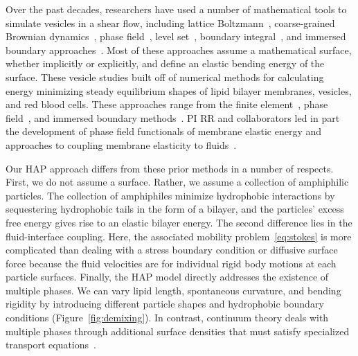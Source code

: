 Over the past decades, researchers have used a number of mathematical
tools to simulate vesicles in a shear flow, including lattice
Boltzmann~\cite{KaouiHartingMisbah2011_PRE}, coarse-grained Brownian
dynamics~\cite{NoguchiTakasu2002_BJ}, phase
field~\cite{DuLiuWang2004_JCP,BibenKassnerMisbah2005_PRE}, level
set~\cite{DoyeuxGuyotChabannesEtAl2013_JCAM}, boundary
integral~\cite{Shravan09,Rahimian15}, and immersed boundary
approaches~\cite{KimLai2010_JCP,KimLai2012_PRE,HuLaiSeolEtAl2016_JCP}.
Most of these approaches assume a mathematical surface, whether
implicitly or explicitly, and define an elastic bending energy of the
surface. These vesicle studies built off of numerical methods for
calculating energy minimizing steady equilibrium shapes of lipid bilayer
membranes, vesicles, and red blood cells. These approaches range from
the finite element~\cite{Bartels,Peng13,RyKlYaCo16,Sinha15},
phase field~\cite{Du05,QiangDu08,Lowengrub13}, and immersed
boundary methods~\cite{Hu,Hu13, KimLai2010_JCP}. PI RR and collaborators
led in part the development of phase field functionals of membrane
elastic energy and approaches to coupling membrane elasticity to
fluids~\cite{0951-7715-18-3-016,Du05,DuEuler,QiangDu09}.



Our HAP approach differs from these prior methods in a number of
respects. First, we do not assume a surface. Rather, we 
assume a collection of amphiphilic particles. The
collection of amphiphiles minimize hydrophobic interactions by
sequestering hydrophobic tails in the form of a bilayer, and the
particles' excess free energy gives rise to an elastic bilayer energy.
The second difference lies in the fluid-interface coupling. Here, the
associated mobility problem~\eqref{eq:stokes} is more complicated than
dealing with a stress boundary condition or diffusive surface force
because the fluid velocities are for individual rigid body motions at each
particle surfaces. Finally, the HAP model directly addresses the
existence of multiple phases. We can vary lipid length, spontaneous
curvature, and bending rigidity by introducing different particle shapes
and hydrophobic boundary conditions (Figure~\ref{fig:demixing}). In
contrast, continuum theory deals with multiple phases through additional
surface densities that must satisfy specialized transport
equations~\cite{Lowengrub07, MikuckiZhou17}. 


